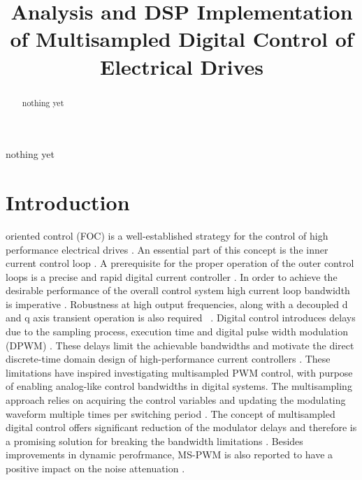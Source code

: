 \documentclass[journal]{IEEEtran}
\begin{document}
\title{Analysis and DSP Implementation of Multisampled Digital Control of Electrical Drives}


\maketitle

\begin{abstract}
nothing yet
\end{abstract}

\begin{IEEEkeywords}
nothing yet
\end{IEEEkeywords}


\IEEEpeerreviewmaketitle

\section{Introduction}
 oriented control (FOC) is a well-established strategy for the control of high performance electrical drives \cite{holmes2012}. An essential part of this concept is the inner current control loop \cite{holmes2009}. A prerequisite for the proper operation of the outer control loops is a precise and rapid digital current controller \cite{yepes2014}. In order to achieve the desirable performance of the overall control system high current loop bandwidth is imperative \cite{choi1998}. Robustness at high output frequencies, along with a decoupled d and q axis transient operation is also required ~\cite{choi1998,hoffmann2016,yim2009}. Digital control introduces delays due to the sampling process, execution time and digital pulse width modulation (DPWM) \cite{holmes2009}. These delays limit the achievable bandwidths and motivate the direct discrete-time domain design of high-performance current controllers \cite{bae2003}. These limitations have inspired investigating multisampled PWM control, with purpose of enabling analog-like control bandwidths in digital systems. The multisampling approach relies on acquiring the control variables and updating the modulating waveform multiple times per switching period \cite{corradini_analysis}. The concept of multisampled digital control offers significant reduction of the modulator delays and therefore is a promising solution for breaking the bandwidth limitations \cite{corradini2018}. Besides improvements in dynamic perofrmance, MS-PWM is also reported to have a positive impact on the noise attenuation \cite{petric2020}. 
\end{document}
